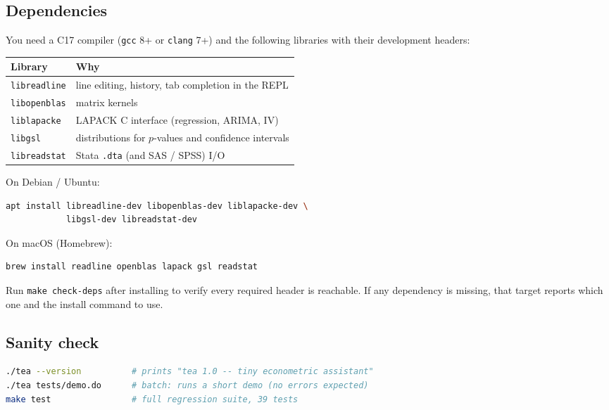 \documentclass[11pt,letterpaper]{article}
\begin{document}
\subsection{Dependencies}

You need a C17 compiler (\texttt{gcc} 8+ or \texttt{clang} 7+) and the
following libraries with their development headers:

\begin{center}
\begin{tabular}{ll}
\toprule
Library & Why \\
\midrule
\texttt{libreadline} & line editing, history, tab completion in the REPL \\
\texttt{libopenblas} & matrix kernels \\
\texttt{liblapacke} & LAPACK C interface (regression, ARIMA, IV) \\
\texttt{libgsl} & distributions for $p$-values and confidence intervals \\
\texttt{libreadstat} & Stata \texttt{.dta} (and SAS / SPSS) I/O \\
\bottomrule
\end{tabular}
\end{center}

On Debian / Ubuntu:

\begin{lstlisting}[language=bash]
apt install libreadline-dev libopenblas-dev liblapacke-dev \
            libgsl-dev libreadstat-dev
\end{lstlisting}

On macOS (Homebrew):

\begin{lstlisting}[language=bash]
brew install readline openblas lapack gsl readstat
\end{lstlisting}

Run \texttt{make check-deps} after installing to verify every required
header is reachable.  If any dependency is missing, that target reports
which one and the install command to use.

\subsection{Sanity check}

\begin{lstlisting}[language=bash]
./tea --version          # prints "tea 1.0 -- tiny econometric assistant"
./tea tests/demo.do      # batch: runs a short demo (no errors expected)
make test                # full regression suite, 39 tests
\end{lstlisting}
\end{document}
